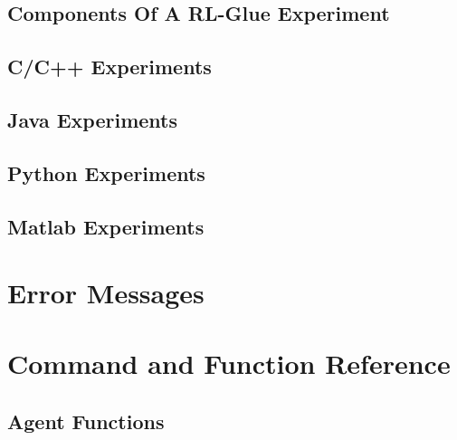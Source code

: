 \documentclass[11pt]{article}
\begin{document}
\subsection{Components Of A RL-Glue Experiment}
\subsection{C/C++ Experiments}
\subsection{Java Experiments}
\subsection{Python Experiments}
\subsection{Matlab Experiments}

\section{Error Messages}
\section{Command and Function Reference}

\subsection{Agent Functions}
 
\end{document}
